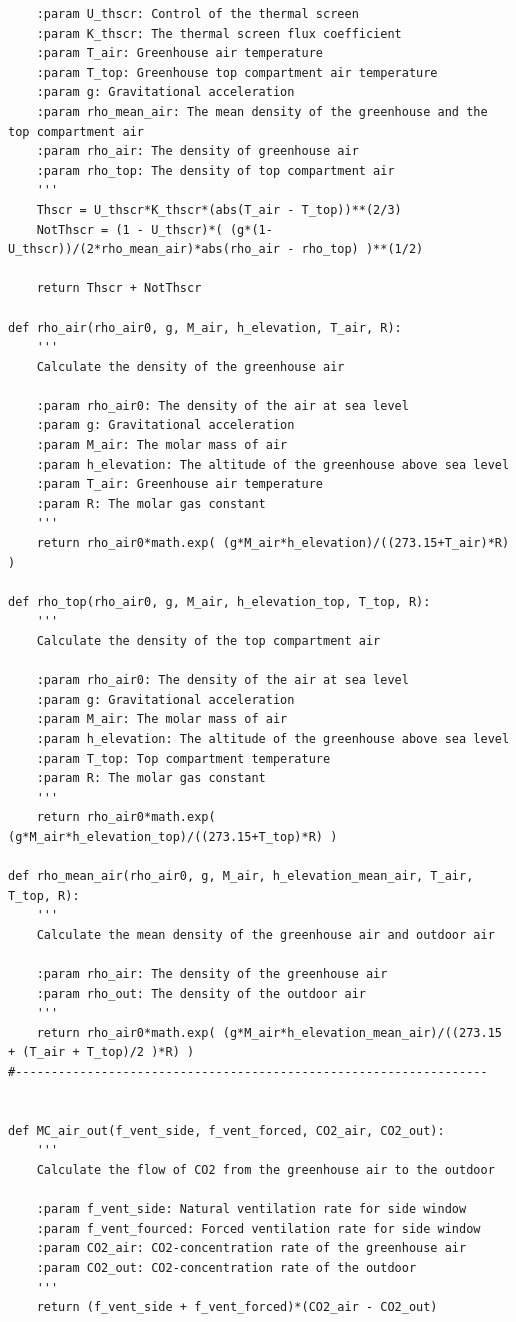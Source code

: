 \documentclass[a4paper]{article}
\begin{document}
\begin{appendices}
\begin{verbatim}
    :param U_thscr: Control of the thermal screen
    :param K_thscr: The thermal screen flux coefficient
    :param T_air: Greenhouse air temperature
    :param T_top: Greenhouse top compartment air temperature
    :param g: Gravitational acceleration
    :param rho_mean_air: The mean density of the greenhouse and the top compartment air
    :param rho_air: The density of greenhouse air
    :param rho_top: The density of top compartment air
    '''
    Thscr = U_thscr*K_thscr*(abs(T_air - T_top))**(2/3) 
    NotThscr = (1 - U_thscr)*( (g*(1-U_thscr))/(2*rho_mean_air)*abs(rho_air - rho_top) )**(1/2)

    return Thscr + NotThscr 

def rho_air(rho_air0, g, M_air, h_elevation, T_air, R):
    '''
    Calculate the density of the greenhouse air

    :param rho_air0: The density of the air at sea level
    :param g: Gravitational acceleration
    :param M_air: The molar mass of air
    :param h_elevation: The altitude of the greenhouse above sea level
    :param T_air: Greenhouse air temperature
    :param R: The molar gas constant
    '''
    return rho_air0*math.exp( (g*M_air*h_elevation)/((273.15+T_air)*R) )

def rho_top(rho_air0, g, M_air, h_elevation_top, T_top, R):
    '''
    Calculate the density of the top compartment air

    :param rho_air0: The density of the air at sea level
    :param g: Gravitational acceleration
    :param M_air: The molar mass of air
    :param h_elevation: The altitude of the greenhouse above sea level
    :param T_top: Top compartment temperature
    :param R: The molar gas constant
    '''
    return rho_air0*math.exp( (g*M_air*h_elevation_top)/((273.15+T_top)*R) )

def rho_mean_air(rho_air0, g, M_air, h_elevation_mean_air, T_air, T_top, R):
    '''
    Calculate the mean density of the greenhouse air and outdoor air

    :param rho_air: The density of the greenhouse air
    :param rho_out: The density of the outdoor air
    '''
    return rho_air0*math.exp( (g*M_air*h_elevation_mean_air)/((273.15 + (T_air + T_top)/2 )*R) )
#------------------------------------------------------------------


def MC_air_out(f_vent_side, f_vent_forced, CO2_air, CO2_out):
    '''
    Calculate the flow of CO2 from the greenhouse air to the outdoor

    :param f_vent_side: Natural ventilation rate for side window
    :param f_vent_fourced: Forced ventilation rate for side window
    :param CO2_air: CO2-concentration rate of the greenhouse air
    :param CO2_out: CO2-concentration rate of the outdoor
    '''
    return (f_vent_side + f_vent_forced)*(CO2_air - CO2_out)


\end{verbatim}
\end{appendices}
\end{document}

